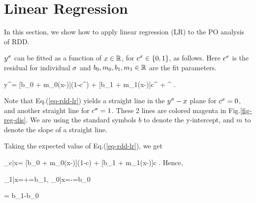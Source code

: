 \section{Linear Regression}
In this
section,
we show how to apply
linear regression (LR)
to the PO analysis of RDD.


$y^\sigma$
can be fitted
as a function of $x\in { \mathbb{R}}$,
for $c^\sigma \in \{0,1\}$,
 as follows.
Here $\epsilon^\sigma$
is the residual
for individual $\sigma$
and $b_0, m_0, b_1, m_1\in { \mathbb{R}}$
are the fit parameters.

\beq
y^\s = [b_0 + m_0(x-\xi)](1-c^\s)
+  [b_1 + m_1(x-\xi)]c^\s
+ \eps^\s
\;.
\label{eq-rdd-lr}
\eeq

Note that Eq.(\ref{eq-rdd-lr})
 yields a straight line
in the $y^\sigma-x$ plane
for $c^\sigma=0$,
and another 
straight line for $c^\sigma=1$.
These 2 lines are 
colored magenta in Fig.\ref{fig-reg-dis}.
We are
using the
standard symbols
$b$ to denote
the y-intercept, and $m$ 
to denote the slope
of a straight line.

Taking the expected value
of Eq.(\ref{eq-rdd-lr}), we get

\beq
\caly_{c|x}=
[b_0 + m_0(x-\xi)](1-c)
+  [b_1 + m_1(x-\xi)]c
\;.
\eeq
Hence,

\beq
\caly_{1|x=\xi+}=b_1\;,\;\;
\caly_{0|x=\xi-}=b_0
\eeq

\beq
\delta= b_1-b_0
\eeq

